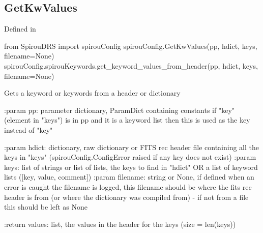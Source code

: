 \noindent\begin{minipage}{\textwidth}
\subsection{GetKwValues}

Defined in \spirouConfig{}

\begin{pythonbox}
from SpirouDRS import spirouConfig
spirouConfig.GetKwValues(pp, hdict, keys, filename=None)
spirouConfig.spirouKeywords.get_keyword_values_from_header(pp, hdict, keys, filename=None)
\end{pythonbox}

\begin{pythondocstring}
Gets a keyword or keywords from a header or dictionary

:param pp: parameter dictionary, ParamDict containing constants
            if "key" (element in "keys") is in pp and it is a
            keyword list then this is used as the key instead of "key"

:param hdict: dictionary, raw dictionary or FITS rec header file containing
              all the keys in "keys" (spirouConfig.ConfigError raised if
              any key does not exist)
:param keys: list of strings or list of lists, the keys to find in "hdict"
             OR a list of keyword lists ([key, value, comment])
:param filename: string or None, if defined when an error is caught the
                 filename is logged, this filename should be where the
                 fits rec header is from (or where the dictionary was
                 compiled from) - if not from a file this should be left
                 as None

:return values: list, the values in the header for the keys
                (size = len(keys))
\end{pythondocstring}
\end{minipage}

